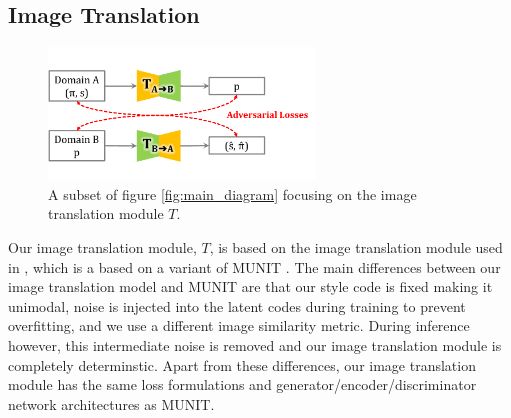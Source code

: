 \documentclass{article}
\begin{document}
\subsection{Image Translation}
\label{sec:image_translation}

\begin{figure}[H]
	\begin{center}
		\includegraphics[width=200pt]{../images/module_translator.pdf}
	\end{center}
	\caption{
		A subset of figure \ref{fig:main_diagram} focusing on the image translation module $T$.
	}
	\label{fig:learnable_textures}
\end{figure}






Our image translation module, $T$, is based on the image translation module used in \citep{surgical_video_translation}, which is a based on a variant \cite{surgical_image_translation} of MUNIT \cite{munit}. The main differences between our image translation model and MUNIT are that our style code is fixed making it unimodal, noise is injected into the latent codes during training to prevent overfitting, and we use a different image similarity metric. During inference however, this intermediate noise is removed and our image translation module is completely determinstic. Apart from these differences, our image translation module has the same loss formulations and generator/encoder/discriminator network architectures as MUNIT. 
\end{document}
